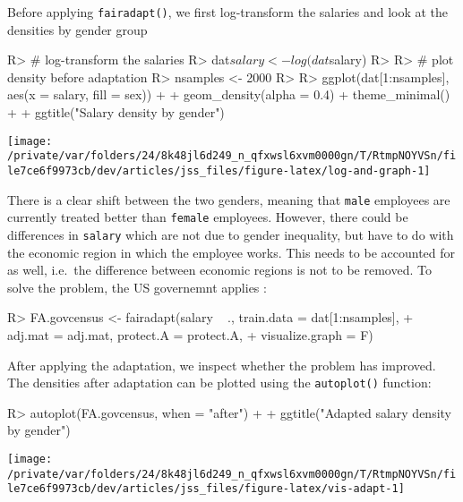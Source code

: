 \documentclass[
  notitle]{jss}
\begin{document}
Before applying \texttt{fairadapt()}, we first log-transform the
salaries and look at the densities by gender group

\begin{CodeChunk}
\begin{CodeInput}
R> # log-transform the salaries
R> dat$salary <- log(dat$salary)
R> 
R> # plot density before adaptation
R> nsamples <- 2000
R> 
R> ggplot(dat[1:nsamples], aes(x = salary, fill = sex)) +
+   geom_density(alpha = 0.4)  + theme_minimal() +
+   ggtitle("Salary density by gender")
\end{CodeInput}


\begin{center}\texttt{[image: /private/var/folders/24/8k48jl6d249\_n\_qfxwsl6xvm0000gn/T/RtmpNOYVSn/file7ce6f9973cb/dev/articles/jss\_files/figure-latex/log-and-graph-1]} \end{center}

\end{CodeChunk}

There is a clear shift between the two genders, meaning that
\texttt{male} employees are currently treated better than
\texttt{female} employees. However, there could be differences in
\texttt{salary} which are not due to gender inequality, but have to do
with the economic region in which the employee works. This needs to be
accounted for as well, i.e.~the difference between economic regions is
not to be removed. To solve the problem, the US governemnt applies
:

\begin{CodeChunk}
\begin{CodeInput}
R> FA.govcensus <- fairadapt(salary ~ ., train.data = dat[1:nsamples],
+                           adj.mat = adj.mat, protect.A = protect.A,
+                           visualize.graph = F)
\end{CodeInput}
\end{CodeChunk}

After applying the adaptation, we inspect whether the problem has
improved. The densities after adaptation can be plotted using the
\texttt{autoplot()} function:

\begin{CodeChunk}
\begin{CodeInput}
R> autoplot(FA.govcensus, when = "after") +
+   ggtitle("Adapted salary density by gender")
\end{CodeInput}


\begin{center}\texttt{[image: /private/var/folders/24/8k48jl6d249\_n\_qfxwsl6xvm0000gn/T/RtmpNOYVSn/file7ce6f9973cb/dev/articles/jss\_files/figure-latex/vis-adapt-1]} \end{center}

\end{CodeChunk}
\end{document}
